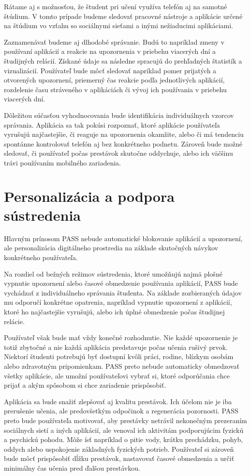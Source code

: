 \documentclass[11pt,a4paper,slovak]{article}
\begin{document}
Rátame aj s možnosťou, že študent pri učení využíva telefón aj na samotné štúdium. V tomto prípade budeme sledovať pracovné nástroje a aplikácie určené na štúdium vo vzťahu so sociálnymi sieťami a inými nežiaducimi aplikáciami.

Zaznamenávať budeme aj dlhodobé správanie. Budú to napríklad zmeny v používaní aplikácií a reakcie na upozornenia v priebehu viacerých dní a študijných relácií. Získané údaje sa následne spracujú do prehľadných štatistík a vizualizácií. Používateľ bude môcť sledovať napríklad pomer prijatých a otvorených upozornení, priemerný čas reakcie podľa jednotlivých aplikácií, rozdelenie času stráveného v aplikáciách či vývoj ich používania v priebehu viacerých dní.

Dôležitou súčasťou vyhodnocovania bude identifikácia individuálnych vzorcov správania. Aplikácia sa tak pokúsi rozpoznať, ktoré aplikácie používateľa vyrušujú najčastejšie, či reaguje na upozornenia okamžite, alebo či má tendenciu spontánne kontrolovať telefón aj bez konkrétneho podnetu. Zároveň bude možné sledovať, či používateľ počas prestávok skutočne oddychuje, alebo ich väčšinu trávi používaním mobilného zariadenia.

\section{Personalizácia a podpora sústredenia}

Hlavným prínosom PASS nebude automatické blokovanie aplikácií a upozornení, ale personalizácia digitálneho prostredia na základe skutočných návykov konkrétneho používateľa.

Na rozdiel od bežných režimov sústredenia, ktoré umožňujú najmä plošné vypnutie upozornení alebo časové obmedzenie používania aplikácií, PASS bude vychádzať z individuálneho správania študenta. Na základe zozbieraných údajov mu odporučí konkrétne opatrenia, napríklad vypnutie upozornení z aplikácií, ktoré ho najčastejšie vyrušujú, alebo ich úplné obmedzenie počas študijnej relácie.

Používateľ však bude mať vždy konečné rozhodnutie. Nie každé upozornenie je totiž zbytočné a nie každá aplikácia predstavuje počas učenia rušivý prvok. Niektorí študenti potrebujú byť dostupní kvôli práci, rodine, blízkym osobám alebo zdravotným pripomienkam. PASS preto nebude automaticky obmedzovať všetky aplikácie, ale umožní používateľovi vybrať si, ktoré odporúčania chce prijať a akým spôsobom si chce zariadenie prispôsobiť.

Aplikácia sa bude snažiť zlepšovať aj kvalitu prestávok. Ich účelom nie je iba prerušenie učenia, ale predovšetkým odpočinok a regenerácia pozornosti. PASS preto bude používateľa motivovať, aby prestávky netrávil nekonečným prezeraním sociálnych sietí a iných aplikácií, ale venoval ich aktivitám podporujúcim fyzickú a psychickú pohodu. Môže ísť napríklad o pitie vody, krátku prechádzku, pohyb, oddych alebo uspokojenie základných fyzických potrieb. Používateľ si zároveň bude môcť prispôsobiť dĺžku prestávok, nastavovať časové obmedzenia a určiť minimálny čas učenia pred ďalšou prestávkou.
\end{document}
